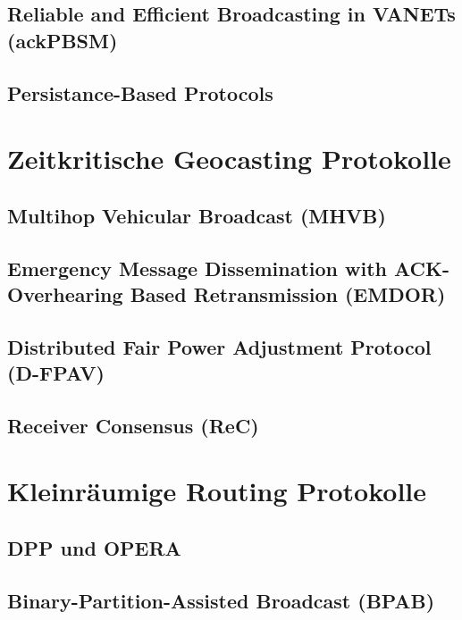 \documentclass[english,runningheads,a4paper]{llncs}[2018/03/10]
\begin{document}
\subsection{Reliable and Efficient Broadcasting in VANETs (ackPBSM)}

\subsection{Persistance-Based Protocols}

\section{Zeitkritische Geocasting Protokolle}
\label{sec:timecriticalgeoprotocolls}

\subsection{Multihop Vehicular Broadcast (MHVB)}

\subsection{Emergency Message Dissemination with ACK-Overhearing Based Retransmission (EMDOR)}

\subsection{Distributed Fair Power Adjustment Protocol (D-FPAV)}

\subsection{Receiver Consensus (ReC)}

\section{Kleinräumige Routing Protokolle}
\label{sec:smallscaleprotocols}

\subsection{DPP und OPERA}

\subsection{Binary-Partition-Assisted Broadcast (BPAB)}
\end{document}
